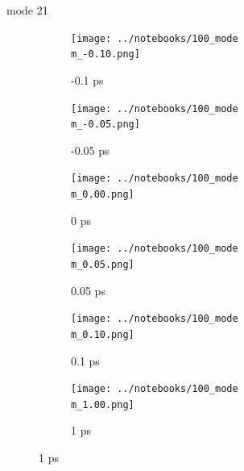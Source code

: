 \documentclass{beamer}
\begin{document}
\renewcommand\m{21}
\begin{frame}{mode \m}
	\begin{figure}
		\centering
		\begin{subfigure}[b]{\w\textwidth}
			\centering
			\texttt{[image: ../notebooks/100\_mode\\m\_-0.10.png]}
			\caption{-0.1 ps}
		\end{subfigure}
		\begin{subfigure}[b]{\w\textwidth}
			\centering
			\texttt{[image: ../notebooks/100\_mode\\m\_-0.05.png]}
			\caption{-0.05 ps}
		\end{subfigure}
		\begin{subfigure}[b]{\w\textwidth}
			\centering
			\texttt{[image: ../notebooks/100\_mode\\m\_0.00.png]}
			\caption{0 ps}
		\end{subfigure}
		\begin{subfigure}[b]{\w\textwidth}
			\centering
			\texttt{[image: ../notebooks/100\_mode\\m\_0.05.png]}
			\caption{0.05 ps}
		\end{subfigure}
		\begin{subfigure}[b]{\w\textwidth}
			\centering
			\texttt{[image: ../notebooks/100\_mode\\m\_0.10.png]}
			\caption{0.1 ps}
		\end{subfigure}
		\begin{subfigure}[b]{\w\textwidth}
			\centering
			\texttt{[image: ../notebooks/100\_mode\\m\_1.00.png]}
			\caption{1 ps}
		\end{subfigure}
	\end{figure}
\end{frame}
\end{document}
